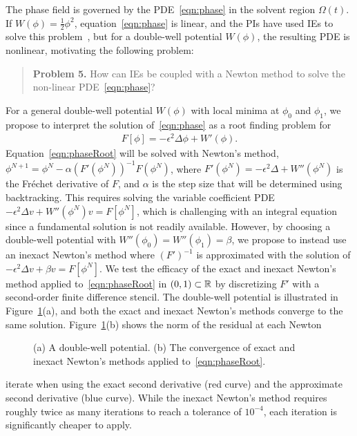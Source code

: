 The phase field is governed by the PDE~\eqref{eqn:phase} in the solvent
region $\Omega(t)$. If $W(\phi) = \tfrac{1}{2}\phi^2$,
equation~\eqref{eqn:phase} is linear, and the PIs have used IEs to solve
this problem~\cite{Fu2018_SIAM, FuQuRyYo22, fu-ryh-qua-you2022}, but for
a double-well potential $W(\phi)$, the resulting PDE is nonlinear,
motivating the following problem:

\begin{quotation}
  \noindent
  \textbf{Problem 5.} How can IEs be coupled with a Newton method to
  solve the non-linear PDE~\eqref{eqn:phase}?
\end{quotation}

For a general double-well potential $W(\phi)$ with local minima at
$\phi_0$ and $\phi_1$, we propose to interpret the solution
of~\eqref{eqn:phase} as a root finding problem for
\begin{align}
  \label{eqn:phaseRoot}
  F[\phi] = -\epsilon^2 \Delta \phi + W'(\phi).
\end{align}
Equation~\eqref{eqn:phaseRoot} will be solved with Newton's method,
$\phi^{N+1} = \phi^{N} - \alpha (F'(\phi^N))^{-1} F(\phi^N)$, where
$F'(\phi^N) = -\epsilon^2 \Delta + W''(\phi^N)$ is the Fr\'{e}chet
derivative of $F$, and $\alpha$ is the step size that will be determined
using backtracking. This requires solving the variable coefficient PDE
$-\epsilon^2 \Delta v + W''(\phi^{N}) v = F[\phi^N]$, which is
challenging with an integral equation since a fundamental solution is
not readily available. However, by choosing a double-well potential with
$W''(\phi_0) = W''(\phi_1) = \beta$, we propose to instead use an
inexact Newton's method where $(F')^{-1}$ is approximated with the
solution of $-\epsilon^2 \Delta v + \beta v = F[\phi^N]$. We test the
efficacy of the exact and inexact Newton's method applied
to~\eqref{eqn:phaseRoot} in $(0,1) \subset \mathbb{R}$ by discretizing $F'$
with a second-order finite difference stencil. The double-well potential
is illustrated in Figure~\ref{fig:CA}(a), and both the exact and inexact
Newton's methods converge to the same solution. Figure~\ref{fig:CA}(b)
shows the norm of the residual at each Newton
\begin{figure}
  \vspace{-7pt}
  \centering
   
  \vspace{-10pt}
  \caption{\label{fig:CA} \footnotesize (a) A double-well potential. (b)
  The convergence of exact and inexact Newton's methods applied
  to~\eqref{eqn:phaseRoot}.}
\end{figure}
iterate when using the exact second derivative (red curve) and the
approximate second derivative (blue curve). While the inexact Newton's
method requires roughly twice as many iterations to reach a tolerance
of $10^{-4}$, each iteration is significantly cheaper to apply.

